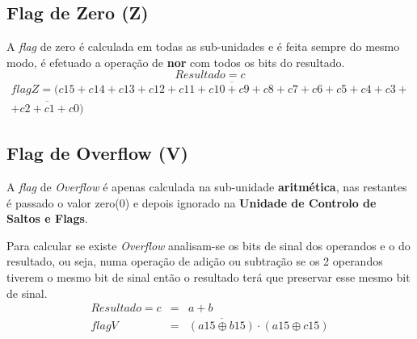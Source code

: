 \subsection{Flag de Zero (Z)}
A \textit{flag} de zero é calculada em todas as sub-unidades e é feita sempre do mesmo modo, é efetuado a operação de \textbf{nor} com todos os bits do resultado.
\[Resultado = c\]
\begin{align*}
	flagZ = \overline{(c15+c14+c13+c12+c11+c10+c9+c8+c7+c6+c5+c4+c3+}&\\
		\overline{+c2+c1+c0)}&
\end{align*}

\subsection{Flag de Overflow (V)}
A \textit{flag} de \textit{Overflow} é apenas calculada na sub-unidade \textbf{aritmética}, nas restantes é passado o valor zero(0) e depois ignorado na \textbf{Unidade de Controlo de Saltos e Flags}.\par
Para calcular se existe \textit{Overflow} analisam-se os bits de sinal dos operandos e o do resultado, ou seja, numa operação de adição ou subtração se os 2 operandos tiverem o mesmo bit de sinal então o resultado terá que preservar esse mesmo bit de sinal.
\[\begin{array}{rcl}
Resultado=c&=&a+b\\
flagV&=&\overline{(a15 \oplus b15)} \cdot (a15 \oplus c15)
\end{array}
\]